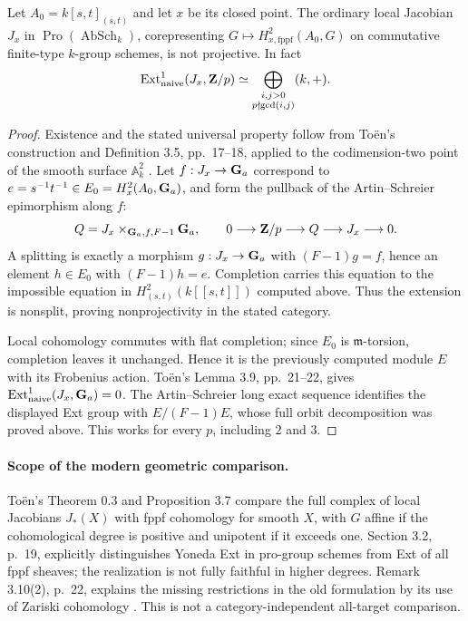 \begin{proposition}
Let $A_0=k[s,t]_{(s,t)}$ and let $x$ be its closed point.
The ordinary local Jacobian $J_x$ in
$\operatorname{Pro}(\operatorname{AbSch}_k)$, corepresenting
$G\mapsto H^2_{x,\mathrm{fppf}}(A_0,G)$ on commutative finite-type
$k$-group schemes, is not projective. In fact
\[
 \operatorname{Ext}^1_{\mathrm{naive}}(J_x,\mathbf Z/p)
 \simeq\bigoplus_{\substack{i,j>0\\p\nmid\gcd(i,j)}}(k,+).
\]
\end{proposition}
\begin{proof}
Existence and the stated universal property follow from To\"en's
construction and Definition 3.5, pp.~17--18, applied to the
codimension-two point of the smooth surface $\mathbb A^2_k$
\cite{Toen2026}. Let $f:J_x\to\mathbf G_a$ correspond to
$e=s^{-1}t^{-1}\in E_0=H^2_x(A_0,\mathbf G_a)$, and form the
pullback of the Artin--Schreier epimorphism along $f$:
\[
 Q=J_x\mathbin{\times}_{\mathbf G_a,f,F-1}\mathbf G_a,
 \qquad 0\longrightarrow\mathbf Z/p\longrightarrow Q
              \longrightarrow J_x\longrightarrow0.
\]
A splitting is exactly a morphism $g:J_x\to\mathbf G_a$ with
$(F-1)g=f$, hence an element $h\in E_0$ with $(F-1)h=e$.
Completion carries this equation to the impossible equation in
$H^2_{(s,t)}(k[[s,t]])$ computed above. Thus the extension is
nonsplit, proving nonprojectivity in the stated category.

Local cohomology commutes with flat completion; since $E_0$ is
$\mathfrak m$-torsion, completion leaves it unchanged. Hence it is
the previously computed module $E$ with its Frobenius action.
To\"en's Lemma 3.9, pp.~21--22, gives
$\operatorname{Ext}^1_{\mathrm{naive}}(J_x,\mathbf G_a)=0$.
The Artin--Schreier long exact sequence identifies the displayed
Ext group with $E/(F-1)E$, whose full orbit decomposition was proved
above. This works for every $p$, including $2$ and $3$.
\end{proof}

\paragraph{Scope of the modern geometric comparison.}
To\"en's Theorem 0.3 and Proposition 3.7 compare the full complex
of local Jacobians $J_*(X)$ with fppf cohomology for smooth $X$,
with $G$ affine if the cohomological degree is positive and unipotent
if it exceeds one. Section 3.2, p.~19, explicitly distinguishes
Yoneda Ext in pro-group schemes from Ext of all fppf sheaves;
the realization is not fully faithful in higher degrees.
Remark 3.10(2), p.~22, explains the missing restrictions in the old
formulation by its use of Zariski cohomology \cite{Toen2026}.
This is not a category-independent all-target comparison.

